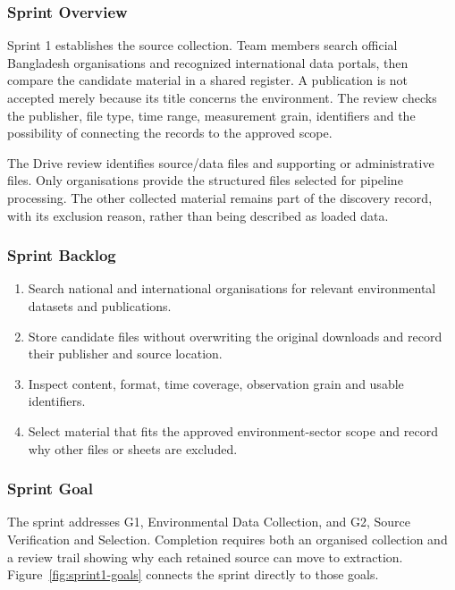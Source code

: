 \subsubsection{Sprint Overview}

Sprint 1 establishes the source collection. Team members search official
Bangladesh organisations and recognized international data portals, then
compare the candidate material in a shared register. A publication is not
accepted merely because its title concerns the environment. The review checks
the publisher, file type, time range, measurement grain, identifiers and the
possibility of connecting the records to the approved scope.

The Drive review identifies \mSourceDataFiles{} source/data files and
\mSupportFiles{} supporting or administrative files. Only
\mSourceOrganisations{} organisations provide the \mSourceFiles{} structured
files selected for pipeline processing. The other
collected material remains part of the discovery record, with its exclusion
reason, rather than being described as loaded data.

\subsubsection{Sprint Backlog}

\begin{enumerate}[leftmargin=*]
  \item Search national and international organisations for relevant
  environmental datasets and publications.
  \item Store candidate files without overwriting the original downloads and
  record their publisher and source location.
  \item Inspect content, format, time coverage, observation grain and usable
  identifiers.
  \item Select material that fits the approved environment-sector scope and
  record why other files or sheets are excluded.
\end{enumerate}

\subsubsection{Sprint Goal}

The sprint addresses G1, Environmental Data Collection, and G2, Source
Verification and Selection. Completion requires both an organised collection
and a review trail showing why each retained source can move to extraction.
Figure~\ref{fig:sprint1-goals} connects the sprint directly to those goals.

